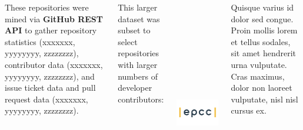 \documentclass[25pt, a0paper, landscape, margin=10mm, innermargin=15mm, blockverticalspace=15mm, subcolspace=8mm, dvipsnames]{tikzposter} %
\begin{document}
\begin{columns}
{{        These repositories were mined via \textbf{GitHub REST API} to gather repository statistics (xxxxxxx, yyyyyyyy, zzzzzzzz), contributor data (xxxxxxx, yyyyyyyy, zzzzzzzz), and issue ticket data and pull request data (xxxxxxx, yyyyyyyy, zzzzzzzz).  




        This larger dataset was subset to select repositories with larger numbers of developer contributors: 


        
        \begin{tikzfigure}
            \includegraphics[height=100mm]{epcclogo.png}
        \end{tikzfigure}
        Quisque varius id dolor sed congue. Proin mollis lorem et tellus sodales, sit amet hendrerit urna vulputate. Cras maximus, dolor non laoreet vulputate, nisl nisl cursus ex.} 
        }


\end{columns}
\end{document}
